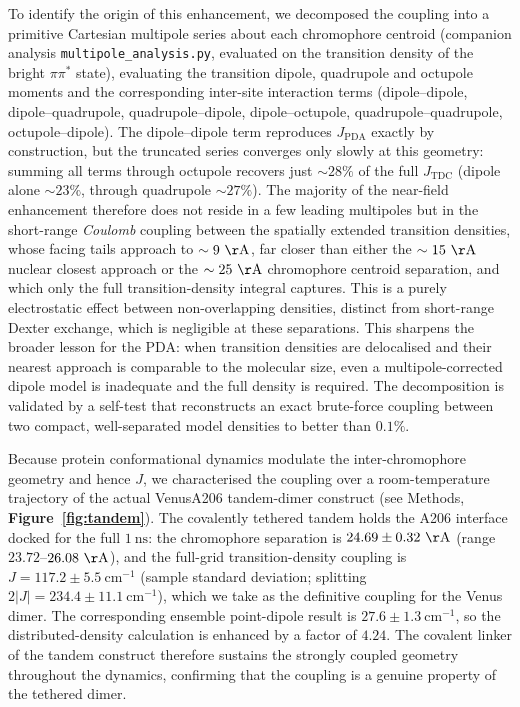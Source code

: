 \documentclass[journal=jpcbfk, manuscript=article, layout=twocolumn, doi=true]{achemso}
\begin{document}
To identify the origin of this enhancement, we decomposed the coupling into a primitive Cartesian multipole series about each chromophore centroid (companion analysis \texttt{multipole\_analysis.py}, evaluated on the transition density of the bright $\pi\pi^{*}$ state), evaluating the transition dipole, quadrupole and octupole moments and the corresponding inter-site interaction terms (dipole--dipole, dipole--quadrupole, quadrupole--dipole, dipole--octupole, quadrupole--quadrupole, octupole--dipole). The dipole--dipole term reproduces $J_{\text{PDA}}$ exactly by construction, but the truncated series converges only slowly at this geometry: summing all terms through octupole recovers just $\sim 28\%$ of the full $J_{\text{TDC}}$ (dipole alone $\sim 23\%$, through quadrupole $\sim 27\%$). The majority of the near-field enhancement therefore does not reside in a few leading multipoles but in the short-range \emph{Coulomb} coupling between the spatially extended transition densities, whose facing tails approach to $\sim 9~\mathrm{\AA}$, far closer than either the $\sim 15~\mathrm{\AA}$ nuclear closest approach or the $\sim 25~\mathrm{\AA}$ chromophore centroid separation, and which only the full transition-density integral captures. This is a purely electrostatic effect between non-overlapping densities, distinct from short-range Dexter exchange, which is negligible at these separations. This sharpens the broader lesson for the PDA: when transition densities are delocalised and their nearest approach is comparable to the molecular size, even a multipole-corrected dipole model is inadequate and the full density is required. The decomposition is validated by a self-test that reconstructs an exact brute-force coupling between two compact, well-separated model densities to better than $0.1\%$.

Because protein conformational dynamics modulate the inter-chromophore geometry and hence $J$, we characterised the coupling over a room-temperature trajectory of the actual VenusA206 tandem-dimer construct (see Methods, \textbf{Figure~\ref{fig:tandem}}). The covalently tethered tandem holds the A206 interface docked for the full $1~\mathrm{ns}$: the chromophore separation is $24.69 \pm 0.32~\mathrm{\AA}$ (range $23.72$--$26.08~\mathrm{\AA}$), and the full-grid transition-density coupling is $J = 117.2 \pm 5.5~\mathrm{cm^{-1}}$ (sample standard deviation; splitting $2|J| = 234.4 \pm 11.1~\mathrm{cm^{-1}}$), which we take as the definitive coupling for the Venus dimer. The corresponding ensemble point-dipole result is $27.6 \pm 1.3~\mathrm{cm^{-1}}$, so the distributed-density calculation is enhanced by a factor of $4.24$. The covalent linker of the tandem construct therefore sustains the strongly coupled geometry throughout the dynamics, confirming that the coupling is a genuine property of the tethered dimer.
\end{document}
